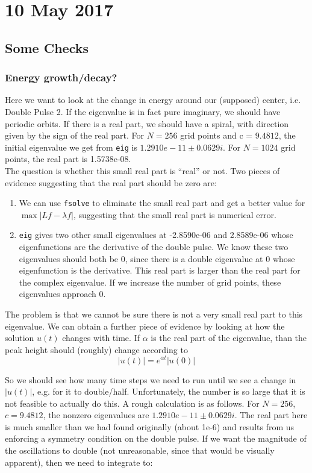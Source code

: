 \documentclass[12pt]{article}
\begin{document}
\section*{10 May 2017}

\subsection*{Some Checks}

\subsubsection*{Energy growth/decay?}

Here we want to look at the change in energy around our (supposed) center, i.e. Double Pulse 2. If the eigenvalue is in fact pure imaginary, we should have periodic orbits. If there is a real part, we should have a spiral, with direction given by the sign of the real part. For $N =256$ grid points and c = $9.4812$, the initial eigenvalue we get from \texttt{eig} is $1.2910e-11 \pm 0.0629i$. For $N = 1024$ grid points, the real part is 1.5738e-08.\\

The question is whether this small real part is ``real'' or not. Two pieces of evidence suggesting that the real part should be zero are:
\begin{enumerate}
	\item We can use \texttt{fsolve} to eliminate the small real part and get a better value for $\max |Lf - \lambda f|$, suggesting that the small real part is numerical error.
	\item \texttt{eig} gives two other small eigenvalues at -2.8590e-06 and 2.8589e-06 whose eigenfunctions are the derivative of the double pulse. We know these two eigenvalues should both be 0, since there is a double eigenvalue at 0 whose eigenfunction is the derivative. This real part is larger than the real part for the complex eigenvalue. If we increase the number of grid points, these eigenvalues approach 0.
\end{enumerate}

The problem is that we cannot be sure there is not a very small real part to this eigenvalue. We can obtain a further piece of evidence by looking at how the solution $u(t)$ changes with time. If $\alpha$ is the real part of the eigenvalue, than the peak height should (roughly) change according to
\[
|u(t)| = e^{\alpha t} |u(0)|
\]

So we should see how many time steps we need to run until we see a change in $|u(t)|$, e.g. for it to double/half. Unfortunately, the number is so large that it is not feasible to actually do this. A rough calculation is as follows. For $N = 256$, $c = 9.4812$, the nonzero eigenvalues are $1.2910e-11 \pm 0.0629i$. The real part here is much smaller than we had found originally (about 1e-6) and results from us enforcing a symmetry condition on the double pulse. If we want the magnitude of the oscillations to double (not unreasonable, since that would be visually apparent), then we need to integrate to:
\end{document}
